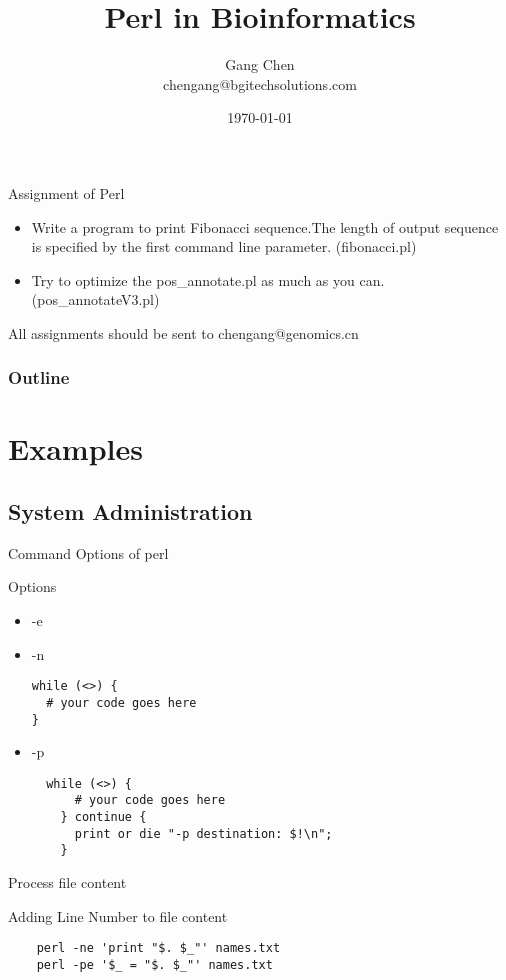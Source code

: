 \documentclass[UTF8]{beamer}
\title{Perl in Bioinformatics}
\author{Gang Chen\\ chengang@bgitechsolutions.com}
\date{\today}
\begin{document}
\begin{frame}
\begin{block}{Assignment of Perl}
\begin{itemize}
\item Write a program to print Fibonacci sequence.The length of output sequence
is specified by the first command line parameter. (fibonacci.pl)
\item Try to optimize the pos_annotate.pl as much as you can. (pos_annotateV3.pl)
\end{itemize}
All assignments should be sent to chengang@genomics.cn
\end{block}
\end{frame}

\begin{frame}
\titlepage
\end{frame}
\begin{frame}[t]\frametitle{Outline}
\tableofcontents[hideallsubsections]
\end{frame}


\section{Examples}

\subsection{System Administration}

\begin{frame}[fragile]{Command Options of perl}
\begin{block}{Options}
  \begin{itemize}
    \item -e
    \item -n
    \begin{verbatim}
while (<>) {
  # your code goes here
}
    \end{verbatim}
    \item -p
\begin{verbatim}
  while (<>) {
      # your code goes here
    } continue {
      print or die "-p destination: $!\n";
    }
\end{verbatim}
  \end{itemize}
\end{block}
\end{frame}

\begin{frame}[fragile]{Process file content}
\begin{block}{Adding Line Number to file content}
  \begin{verbatim}
    perl -ne 'print "$. $_"' names.txt
    perl -pe '$_ = "$. $_"' names.txt
  \end{verbatim}
\end{block}
\end{frame}
\end{document}
